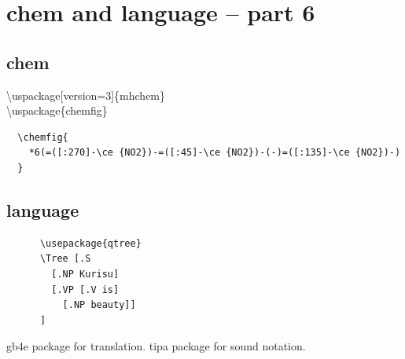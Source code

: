 \documentclass[11pt,a4paper]{article}
\begin{document}
\section{chem and language -- part 6}{
  \subsection{chem}{
    \textbackslash{}uspackage[version=3]\{mhchem\} \\
    \textbackslash{}uspackage\{chemfig\} \\    
                  {
\begin{verbatim}
  \chemfig{
    *6(=([:270]-\ce {NO2})-=([:45]-\ce {NO2})-(-)=([:135]-\ce {NO2})-)
  }
\end{verbatim}
                  }
  }
  
  \subsection{language}{
    {
\begin{verbatim}
      \usepackage{qtree}
      \Tree [.S
        [.NP Kurisu]
        [.VP [.V is]
          [.NP beauty]]
      ]
\end{verbatim}
    }
    gb4e package for translation.
    tipa package for sound notation.
  }
}
\end{document}

